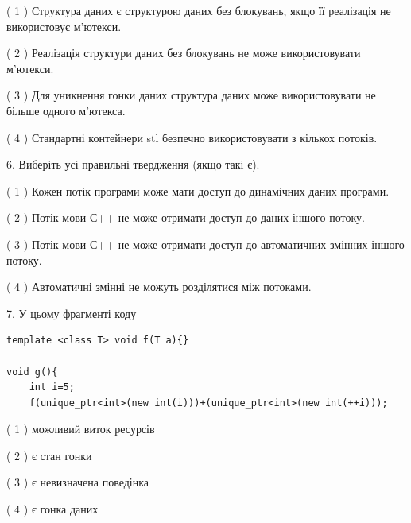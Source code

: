 \documentclass[12pt, ukrainian]{article}
\begin{document}
\begin {large}
{( 1 ) Структура даних є структурою даних без блокувань, якщо її реалізація не використовує м’ютекси.%

( 2 ) Реалізація структури даних без блокувань не може використовувати м’ютекси.%

( 3 ) Для уникнення гонки даних структура даних може використовувати не більше одного м’ютекса.%

( 4 ) Стандартні контейнери stl безпечно використовувати з кількох потоків.%
\newpage



\vspace{5mm}
6. Виберіть усі правильні твердження (якщо такі є).\par
\vspace{2mm}

( 1 ) Кожен потік програми може мати доступ до динамічних даних програми.%

( 2 ) Потік мови С++ не може отримати доступ до даних іншого потоку.%

( 3 ) Потік мови С++ не може отримати доступ до автоматичних змінних іншого потоку.%

( 4 ) Автоматичні змінні не можуть розділятися між потоками.%


\vspace{5mm}
7. У цьому фрагменті коду
\begin{verbatim}
template <class T> void f(T a){}

void g(){
    int i=5;
    f(unique_ptr<int>(new int(i)))+(unique_ptr<int>(new int(++i)));
\end{verbatim}
( 1 ) можливий виток ресурсів%

( 2 ) є стан гонки%

( 3 ) є невизначена поведінка%

( 4 ) є гонка даних%
}
\end {large}
\end{document}
